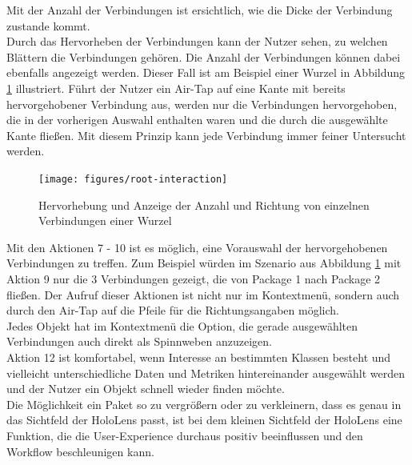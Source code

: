 \noindent Mit der Anzahl der Verbindungen ist ersichtlich, wie die Dicke der Verbindung zustande kommt.\\

\noindent Durch das Hervorheben der Verbindungen kann der Nutzer sehen, zu welchen Blättern die Verbindungen gehören. Die Anzahl der Verbindungen können dabei ebenfalls angezeigt werden. Dieser Fall ist am Beispiel einer Wurzel in Abbildung \ref{fig:root-interaction} illustriert. Führt der Nutzer ein Air-Tap auf eine Kante mit bereits hervorgehobener Verbindung aus, werden nur die Verbindungen hervorgehoben, die in der vorherigen Auswahl enthalten waren und die durch die ausgewählte Kante fließen. Mit diesem Prinzip kann jede Verbindung immer feiner Untersucht werden.\\

\begin{figure}[htb]
  \texttt{[image: figures/root-interaction]}
  \caption{Hervorhebung und Anzeige der Anzahl und Richtung von einzelnen Verbindungen einer Wurzel}
  \label{fig:root-interaction}
\end{figure}

\noindent Mit den Aktionen 7 - 10 ist es möglich, eine Vorauswahl der hervorgehobenen Verbindungen zu treffen. Zum Beispiel würden im Szenario aus Abbildung \ref{fig:root-interaction} mit Aktion 9 nur die 3 Verbindungen gezeigt, die von Package 1 nach Package 2 fließen. Der Aufruf dieser Aktionen ist nicht nur im Kontextmenü, sondern auch durch den Air-Tap auf die Pfeile für die Richtungsangaben möglich. \\

\noindent Jedes Objekt hat im Kontextmenü die Option, die gerade ausgewählten Verbindungen auch direkt als Spinnweben anzuzeigen.\\

\noindent Aktion 12 ist komfortabel, wenn Interesse an bestimmten Klassen besteht und vielleicht unterschiedliche Daten und Metriken hintereinander ausgewählt werden und der Nutzer ein Objekt schnell wieder finden möchte.\\

\noindent Die Möglichkeit ein Paket so zu vergrößern oder zu verkleinern, dass es genau in das Sichtfeld der HoloLens passt, ist bei dem kleinen Sichtfeld der HoloLens eine Funktion, die die User-Experience durchaus positiv beeinflussen und den Workflow beschleunigen kann.\\

